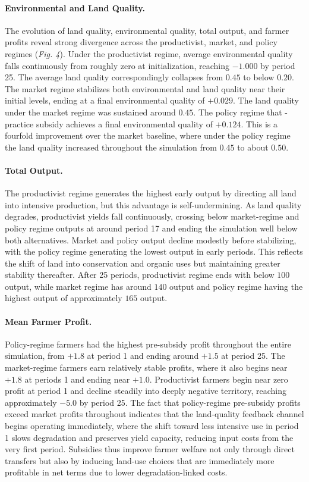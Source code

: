 \documentclass{article}
\begin{document}
\paragraph{Environmental and Land Quality.} The evolution of land quality, environmental quality, total output, and farmer profits reveal strong divergence across the productivist, market, and policy regimes (\textit{Fig. 4}). Under the productivist regime, average environmental quality falls continuously from roughly zero at initialization, reaching $-1.000$ by period 25. The average land quality correspondingly collapses from $0.45$ to below $0.20$. The market regime stabilizes both environmental and land quality near their initial levels, ending at a final environmental quality of $+0.029$. The land quality under the market regime was sustained around $0.45$. The policy regime that -practice subsidy achieves a final environmental quality of $+0.124$. This is a fourfold improvement over the market baseline, where under the policy regime the land quality increased throughout the simulation from $0.45$ to about $0.50$. 

\paragraph{Total Output.} The productivist regime generates the highest early output by directing all land into intensive production, but this advantage is self-undermining. As land quality degrades, productivist yields fall continuously, crossing below market-regime and policy regime outputs at around period 17 and ending the simulation well below both alternatives. Market and policy output decline modestly before stabilizing, with the policy regime generating the lowest output in early periods. This reflects the shift of land into conservation and organic uses but maintaining greater stability thereafter. After 25 periods, productivist regime ends with below $100$ output, while market regime has around $140$ output and policy regime having the highest output of approximately $165$ output. 

\paragraph{Mean Farmer Profit.} Policy-regime farmers had the highest pre-subsidy profit throughout the entire simulation, from $+1.8$ at period 1 and ending around $+1.5$ at period 25. The market-regime farmers earn relatively stable profits, where it also begins near $+1.8$ at periods 1 and ending near $+1.0$. Productivist farmers begin near zero profit at period 1 and decline steadily into deeply negative territory, reaching approximately $-5.0$ by period 25. The fact that policy-regime pre-subsidy profits exceed market profits throughout indicates that the land-quality feedback channel begins operating immediately, where the shift toward less intensive use in period 1 slows degradation and preserves yield capacity, reducing input costs from the very first period. Subsidies thus improve farmer welfare not only through direct transfers but also by inducing land-use choices that are immediately more profitable in net terms due to lower degradation-linked costs.
\end{document}

